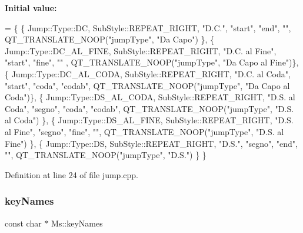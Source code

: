 {\bfseries Initial value\+:}
\begin{DoxyCode}
= \{
      \{ Jump::Type::DC,         SubStyle::REPEAT\_RIGHT, \textcolor{stringliteral}{"D.C."},         \textcolor{stringliteral}{"start"}, \textcolor{stringliteral}{"end"},  \textcolor{stringliteral}{""},      
      QT\_TRANSLATE\_NOOP(\textcolor{stringliteral}{"jumpType"}, \textcolor{stringliteral}{"Da Capo"})        \},
      \{ Jump::Type::DC\_AL\_FINE, SubStyle::REPEAT\_RIGHT, \textcolor{stringliteral}{"D.C. al Fine"}, \textcolor{stringliteral}{"start"}, \textcolor{stringliteral}{"fine"}, \textcolor{stringliteral}{""} ,     
      QT\_TRANSLATE\_NOOP(\textcolor{stringliteral}{"jumpType"}, \textcolor{stringliteral}{"Da Capo al Fine"})\},
      \{ Jump::Type::DC\_AL\_CODA, SubStyle::REPEAT\_RIGHT, \textcolor{stringliteral}{"D.C. al Coda"}, \textcolor{stringliteral}{"start"}, \textcolor{stringliteral}{"coda"}, \textcolor{stringliteral}{"codab"}, 
      QT\_TRANSLATE\_NOOP(\textcolor{stringliteral}{"jumpType"}, \textcolor{stringliteral}{"Da Capo al Coda"})\},
      \{ Jump::Type::DS\_AL\_CODA, SubStyle::REPEAT\_RIGHT, \textcolor{stringliteral}{"D.S. al Coda"}, \textcolor{stringliteral}{"segno"}, \textcolor{stringliteral}{"coda"}, \textcolor{stringliteral}{"codab"}, 
      QT\_TRANSLATE\_NOOP(\textcolor{stringliteral}{"jumpType"}, \textcolor{stringliteral}{"D.S. al Coda"})   \},
      \{ Jump::Type::DS\_AL\_FINE, SubStyle::REPEAT\_RIGHT, \textcolor{stringliteral}{"D.S. al Fine"}, \textcolor{stringliteral}{"segno"}, \textcolor{stringliteral}{"fine"}, \textcolor{stringliteral}{""},      
      QT\_TRANSLATE\_NOOP(\textcolor{stringliteral}{"jumpType"}, \textcolor{stringliteral}{"D.S. al Fine"})   \},
      \{ Jump::Type::DS,         SubStyle::REPEAT\_RIGHT, \textcolor{stringliteral}{"D.S."},         \textcolor{stringliteral}{"segno"}, \textcolor{stringliteral}{"end"},  \textcolor{stringliteral}{""},      
      QT\_TRANSLATE\_NOOP(\textcolor{stringliteral}{"jumpType"}, \textcolor{stringliteral}{"D.S."})           \}
      \}
\end{DoxyCode}


Definition at line 24 of file jump.\+cpp.

\mbox{\label{namespace_ms_a01088021625cb3d18d6f372d39f5337b}} 
\subsubsection{\texorpdfstring{key\+Names}{keyNames}}
{\footnotesize\ttfamily const char $\ast$ Ms\+::key\+Names}


